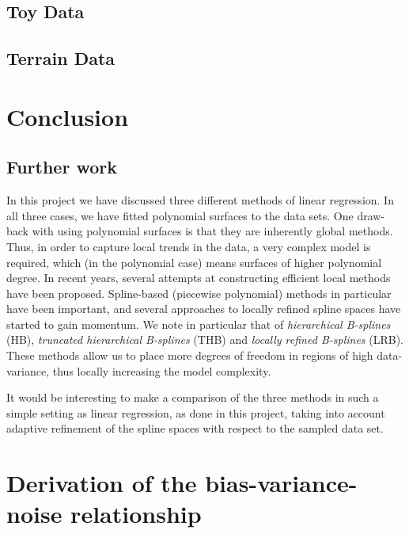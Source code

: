 \documentclass[dvipsnames, article, a4paper, oneside, 12pt]{memoir}
\begin{document}
  \section{Toy Data}
   
  
  \section{Terrain Data}
	
  \chapter{Conclusion}

  
  \section{Further work}

  In this project we have discussed three different methods of linear
  regression.  In all three cases, we have fitted polynomial surfaces to the
  data sets. One draw-back with using polynomial surfaces is that they are
  inherently global methods. Thus, in order to capture local trends in the
  data, a very complex model is required, which (in the polynomial case) means
  surfaces of higher polynomial degree. In recent years, several attempts at
  constructing efficient local methods have been proposed. Spline-based
  (piecewise polynomial) methods in particular have been important, and several
  approaches to locally refined spline spaces have started to gain momentum.
  We note in particular that of \emph{hierarchical B-splines} (HB),
  \emph{truncated hierarchical B-splines} (THB) and \emph{locally refined
  B-splines} (LRB). These methods allow us to place more degrees of freedom in regions of high
  data-variance, thus locally increasing the model complexity. 

  It would be interesting to make a comparison of the three methods in such a
  simple setting as linear regression, as done in this project, taking into
  account adaptive refinement of the spline spaces with respect to the sampled
  data set.
 

   

  \appendix
  \chapter{Derivation of the bias-variance-noise relationship}
  \label{ap:derivation}
  
\end{document}
